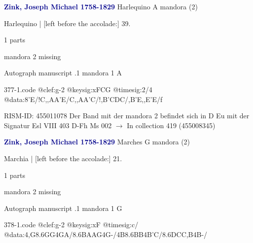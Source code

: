 \documentclass[twocolumn]{book}
\begin{document}
\newline \par \vspace{7pt} \textcolor{darkblue}{\textbf{Zink, Joseph Michael  1758-1829}}
\newline Harlequino  A  
\newline mandora (2)
\newline \begin{itshape}[f.23r, at left:] Harlequino | [left before the accolade:] 39.\end{itshape} 
\newline \textcolor{darkblue}{}  1 parts  
\newline \begin{small} mandora 2 missing\end{small} 
\newline Autograph manuscript
.1  mandora 1  A  
\begin{filecontents*}{377-1.code}
@clef:g-2
@keysig:xFCG
@timesig:2/4
@data:8'E/!C,,AA'E/C,,AA'C/!{,B'C}{DC}/,B'E,,E'E/f
\end{filecontents*}
\newline
%

\newline RISM-ID: 455011078
\newline Der Band mit der mandora 2 befindet sich in D Eu mit der Signatur Esl VIII 403
\newline D-Fh  Ms 002
\newline $\rightarrow$ In collection 419 (455008345)

\newline \par \vspace{7pt} \textcolor{darkblue}{\textbf{Zink, Joseph Michael  1758-1829}}
\newline Marches  G  
\newline mandora (2)
\newline \begin{itshape}[f.14v, at left:] Marchia | [left before the accolade:] 21.\end{itshape} 
\newline \textcolor{darkblue}{}  1 parts  
\newline \begin{small} mandora 2 missing\end{small} 
\newline Autograph manuscript
.1  mandora 1  G  
\begin{filecontents*}{378-1.code}
@clef:g-2
@keysig:xF
@timesig:c/
@data:4,G{8.6GG}4GA/{8.6BA}{AG}4G-/4B{8.6BB}4B'C/{8.6DC}{C,B}4B-/
\end{filecontents*}
\newline
%
\end{document}
